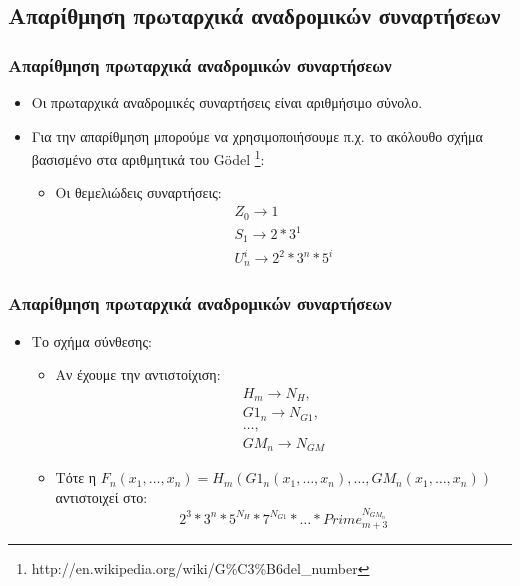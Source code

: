 \documentclass{beamer}
\begin{document}
\subsection{Απαρίθμηση πρωταρχικά αναδρομικών συναρτήσεων}

\begin{frame}
        \frametitle{Απαρίθμηση πρωταρχικά αναδρομικών συναρτήσεων}
        \begin{itemize}
                \item Οι πρωταρχικά αναδρομικές συναρτήσεις είναι αριθμήσιμο σύνολο.
                \pause
                \item Για την απαρίθμηση μπορούμε να χρησιμοποιήσουμε π.χ. το 
                ακόλουθο σχήμα βασισμένο στα αριθμητικά του G\"odel
                \footnote{
                {http://en.wikipedia.org/wiki/G\%C3\%B6del_number}}:
                \begin{itemize}
                        \item Οι θεμελιώδεις συναρτήσεις:
                        $$\begin{array}{l}
                            Z_0 \rightarrow 1 \\
                            S_1 \rightarrow 2*3^1 \\
                            U^i_n \rightarrow 2^2*3^n*5^i
                        \end{array}$$
                \end{itemize}
        \end{itemize}
\end{frame}

\begin{frame}
        \frametitle{Απαρίθμηση πρωταρχικά αναδρομικών συναρτήσεων}
        \begin{itemize}
                \item Το σχήμα σύνθεσης:
                \begin{itemize}
                        \item Αν έχουμε την αντιστοίχιση:
                        $$\begin{array}{l}
                            H_m \rightarrow N_H,\\
                            G1_n \rightarrow N_{G1},\\
                            \ldots,\\
                            GM_n \rightarrow N_{GM}
                        \end{array}$$
                \pause
                        \item Τότε η $F_n(x_1,\ldots,x_n) = H_m(G1_n(x_1,\ldots,x_n),\ldots,GM_n(x_1,\ldots,x_n))$
                        αντιστοιχεί στο:
                        $$2^3*3^n*5^{N_H}*7^{N_{G1}}*\ldots*Prime_{m+3}^{N_{GM_n}}$$
                \end{itemize}                   
        \end{itemize}
\end{frame}
\end{document}
